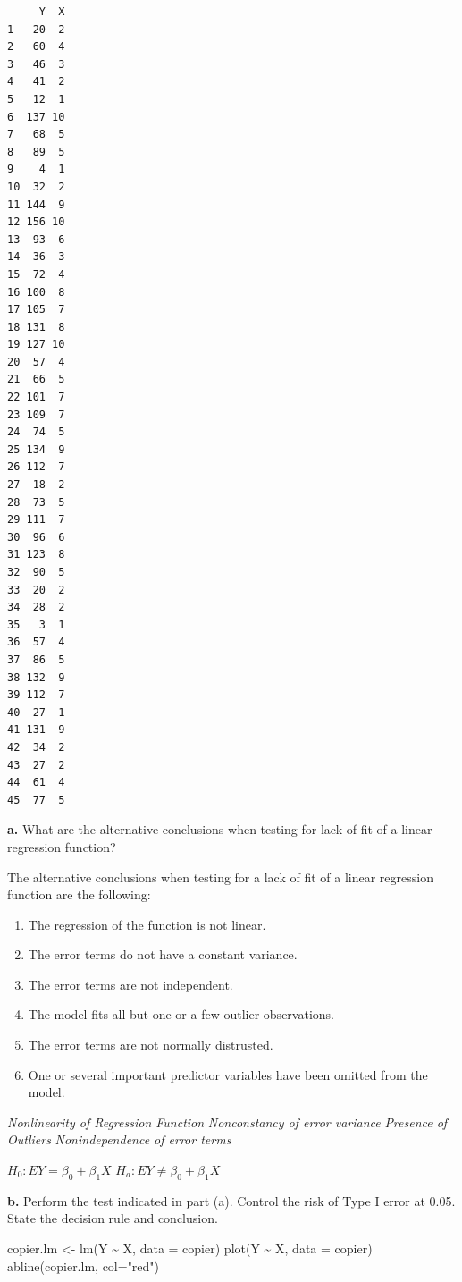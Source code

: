 \documentclass[
  letterpaper,
  DIV=11,
  numbers=noendperiod]{scrartcl}
\newenvironment{Shaded}{\begin{snugshade}}{\end{snugshade}}
\newcommand{\AttributeTok}[1]{\textcolor[rgb]{0.40,0.45,0.13}{#1}}
\newcommand{\FunctionTok}[1]{\textcolor[rgb]{0.28,0.35,0.67}{#1}}
\newcommand{\NormalTok}[1]{\textcolor[rgb]{0.00,0.23,0.31}{#1}}
\newcommand{\OtherTok}[1]{\textcolor[rgb]{0.00,0.23,0.31}{#1}}
\newcommand{\SpecialCharTok}[1]{\textcolor[rgb]{0.37,0.37,0.37}{#1}}
\newcommand{\StringTok}[1]{\textcolor[rgb]{0.13,0.47,0.30}{#1}}
\providecommand{\tightlist}{%
  \setlength{\itemsep}{0pt}\setlength{\parskip}{0pt}}\usepackage{longtable,booktabs,array}
\begin{document}
\begin{verbatim}
     Y  X
1   20  2
2   60  4
3   46  3
4   41  2
5   12  1
6  137 10
7   68  5
8   89  5
9    4  1
10  32  2
11 144  9
12 156 10
13  93  6
14  36  3
15  72  4
16 100  8
17 105  7
18 131  8
19 127 10
20  57  4
21  66  5
22 101  7
23 109  7
24  74  5
25 134  9
26 112  7
27  18  2
28  73  5
29 111  7
30  96  6
31 123  8
32  90  5
33  20  2
34  28  2
35   3  1
36  57  4
37  86  5
38 132  9
39 112  7
40  27  1
41 131  9
42  34  2
43  27  2
44  61  4
45  77  5
\end{verbatim}

\textbf{a.} What are the alternative conclusions when testing for lack
of fit of a linear regression function?

The alternative conclusions when testing for a lack of fit of a linear
regression function are the following:

\begin{enumerate}
\def\labelenumi{\arabic{enumi}.}
\tightlist
\item
  The regression of the function is not linear.
\item
  The error terms do not have a constant variance.
\item
  The error terms are not independent.
\item
  The model fits all but one or a few outlier observations.
\item
  The error terms are not normally distrusted.
\item
  One or several important predictor variables have been omitted from
  the model.
\end{enumerate}

\emph{Nonlinearity of Regression Function} \emph{Nonconstancy of error
variance} \emph{Presence of Outliers} \emph{Nonindependence of error
terms}

\(H_{0}: E{Y} = \beta_{0} + \beta_{1} X\)
\(H_{a}: E{Y} \neq \beta_{0} + \beta_{1} X\)

\textbf{b.} Perform the test indicated in part (a). Control the risk of
Type I error at 0.05. State the decision rule and conclusion.

\begin{Shaded}
\begin{Highlighting}[]
\NormalTok{copier.lm }\OtherTok{\textless{}{-}} \FunctionTok{lm}\NormalTok{(Y }\SpecialCharTok{\textasciitilde{}}\NormalTok{ X, }\AttributeTok{data =}\NormalTok{ copier)}
\FunctionTok{plot}\NormalTok{(Y }\SpecialCharTok{\textasciitilde{}}\NormalTok{ X, }\AttributeTok{data =}\NormalTok{ copier)}
\FunctionTok{abline}\NormalTok{(copier.lm, }\AttributeTok{col=}\StringTok{"red"}\NormalTok{)}
\end{Highlighting}
\end{Shaded}
\end{document}
